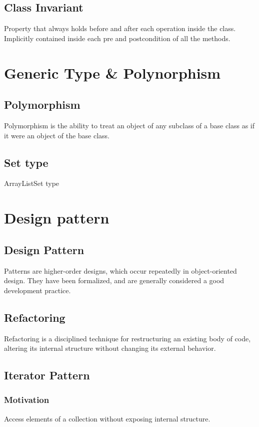 \documentclass[a4paper]{scrartcl}
\begin{document}
    \subsection {Class Invariant}
      Property that always holds before and after each operation inside the class.\\
      Implicitly contained inside each pre and postcondition of all the methods.
       
       
   
  \section{Generic Type \& Polynorphism}
    \subsection {Polymorphism}
      Polymorphism is the ability to treat an object of any subclass of a base class as if it were an object of the base class.

    \subsection {Set type}
      
    
    ArrayListSet type
    
    
  \section{Design pattern}
    \subsection {Design Pattern }
      Patterns are higher-order designs, which occur repeatedly in object-oriented design. They have been formalized, and are generally considered a good development practice.
    \subsection { Refactoring }
      Refactoring is a disciplined technique for restructuring an existing body of code, altering its internal structure without changing its external behavior.
    \subsection { Iterator Pattern }
      \subsubsection {Motivation}
        Access elements of a collection without exposing internal structure.
\end{document}
